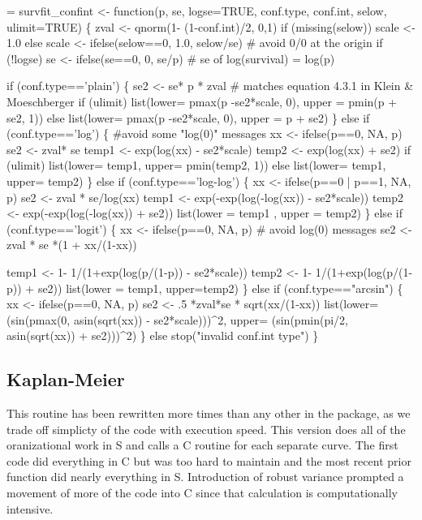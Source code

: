 \documentclass{article}
\begin{document}
\begin{nwchunk}
=
 survfit_confint <- function(p, se, logse=TRUE, conf.type, conf.int,
                             selow, ulimit=TRUE) \{
     zval <- qnorm(1- (1-conf.int)/2, 0,1)
     if (missing(selow)) scale <- 1.0
     else scale <- ifelse(selow==0, 1.0, selow/se)  # avoid 0/0 at the origin
     if (!logse) se <- ifelse(se==0, 0, se/p)   # se of log(survival) = log(p)
 
     if (conf.type=='plain') \{
         se2 <- se* p * zval  # matches equation 4.3.1 in Klein & Moeschberger
         if (ulimit) list(lower= pmax(p -se2*scale, 0), upper = pmin(p + se2, 1))
         else  list(lower= pmax(p -se2*scale, 0), upper = p + se2)
     \}
     else if (conf.type=='log') \{
         #avoid some "log(0)" messages
         xx <- ifelse(p==0, NA, p)  
         se2 <- zval* se 
         temp1 <- exp(log(xx) - se2*scale)
         temp2 <- exp(log(xx) + se2)
         if (ulimit) list(lower= temp1, upper= pmin(temp2, 1))
         else  list(lower= temp1, upper= temp2)
     \}
     else if (conf.type=='log-log') \{
         xx <- ifelse(p==0 | p==1, NA, p)
         se2 <- zval * se/log(xx)
         temp1 <- exp(-exp(log(-log(xx)) - se2*scale))
         temp2 <- exp(-exp(log(-log(xx)) + se2))
         list(lower = temp1 , upper = temp2)
     \}
     else if (conf.type=='logit') \{
         xx <- ifelse(p==0, NA, p)  # avoid log(0) messages
         se2 <- zval * se *(1 + xx/(1-xx))
  
         temp1 <- 1- 1/(1+exp(log(p/(1-p)) - se2*scale))
         temp2 <- 1- 1/(1+exp(log(p/(1-p)) + se2))
         list(lower = temp1, upper=temp2)
     \}
     else if (conf.type=="arcsin") \{
         xx <- ifelse(p==0, NA, p)
         se2 <- .5 *zval*se * sqrt(xx/(1-xx))
         list(lower= (sin(pmax(0, asin(sqrt(xx)) - se2*scale)))^2,
              upper= (sin(pmin(pi/2, asin(sqrt(xx)) + se2)))^2)
     \}
     else stop("invalid conf.int type")
 \}
\end{nwchunk}
\subsection{Kaplan-Meier}
This routine has been rewritten more times than any other in the package,
as we trade off simplicty of the code with execution speed.  
This version does all of the oranizational work in S and calls a C
routine for each separate curve. 
The first code did everything in C but was too hard to maintain and the most
recent prior function did nearly everything in S. 
Introduction of robust variance
prompted a movement of more of the code into C since that calculation
is computationally intensive.
\end{document}
